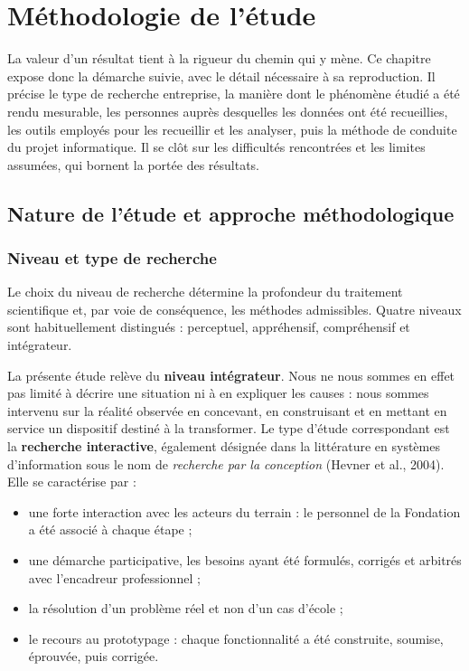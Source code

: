\chapter{Méthodologie de l'étude}
\label{chap:methodo}

\introchap

La valeur d'un résultat tient à la rigueur du chemin qui y mène. Ce chapitre
expose donc la démarche suivie, avec le détail nécessaire à sa reproduction. Il
précise le type de recherche entreprise, la manière dont le phénomène étudié a
été rendu mesurable, les personnes auprès desquelles les données ont été
recueillies, les outils employés pour les recueillir et les analyser, puis la
méthode de conduite du projet informatique. Il se clôt sur les difficultés
rencontrées et les limites assumées, qui bornent la portée des résultats.

\section{Nature de l'étude et approche méthodologique}
\label{sec:nature}

\subsection{Niveau et type de recherche}

Le choix du niveau de recherche détermine la profondeur du traitement
scientifique et, par voie de conséquence, les méthodes admissibles. Quatre
niveaux sont habituellement distingués : perceptuel, appréhensif, compréhensif
et intégrateur.

La présente étude relève du \textbf{niveau intégrateur}. Nous ne nous sommes en
effet pas limité à décrire une situation ni à en expliquer les causes : nous
sommes intervenu sur la réalité observée en concevant, en construisant et en
mettant en service un dispositif destiné à la transformer. Le type d'étude
correspondant est la \textbf{recherche interactive}, également désignée dans la
littérature en systèmes d'information sous le nom de \emph{recherche par la
conception} (Hevner et al., 2004). Elle se caractérise par :

\begin{itemize}
  \item une forte interaction avec les acteurs du terrain : le personnel de la
        Fondation a été associé à chaque étape ;
  \item une démarche participative, les besoins ayant été formulés, corrigés et
        arbitrés avec l'encadreur professionnel ;
  \item la résolution d'un problème réel et non d'un cas d'école ;
  \item le recours au prototypage : chaque fonctionnalité a été construite,
        soumise, éprouvée, puis corrigée.
\end{itemize}

